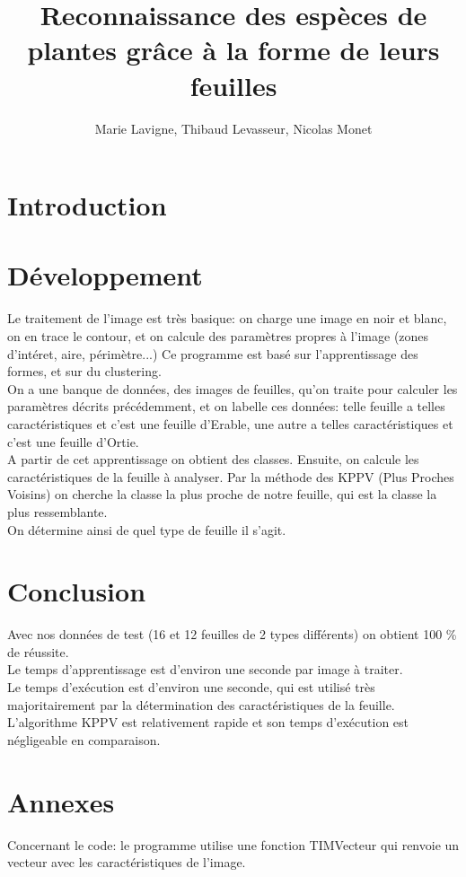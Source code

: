 \documentclass{article}
\title{Reconnaissance des espèces de plantes grâce à la forme de leurs feuilles}
\author{Marie Lavigne, Thibaud Levasseur, Nicolas Monet}
\begin{document}
\maketitle
\newpage
\tableofcontents
\newpage
\section{Introduction}

\newpage
\section{Développement}
Le traitement de l'image est très basique: on charge une image en noir et blanc, on en trace le contour, et on calcule des paramètres propres à l'image (zones d'intéret, aire, périmètre...)
\smallbreak
Ce programme est basé sur l'apprentissage des formes, et sur du clustering. \\
On a une banque de données, des images de feuilles, qu'on traite pour calculer les paramètres décrits précédemment, et on labelle ces données: telle feuille a telles caractéristiques et c'est une feuille d'Erable, une autre a telles caractéristiques et c'est une feuille d'Ortie. \\
A partir de cet apprentissage on obtient des classes.
\smallbreak
Ensuite, on calcule les caractéristiques de la feuille à analyser. Par la méthode des KPPV (Plus Proches Voisins) on cherche la classe la plus proche de notre feuille, qui est la classe la plus ressemblante. \\
On détermine ainsi de quel type de feuille il s'agit.
\newpage
\section{Conclusion}
Avec nos données de test (16 et 12 feuilles de 2 types différents) on obtient 100 \% de réussite.\\
Le temps d'apprentissage est d'environ une seconde par image à traiter. \\
Le temps d'exécution est d'environ une seconde, qui est utilisé très majoritairement par la détermination des caractéristiques de la feuille. L'algorithme KPPV est relativement rapide et son temps d'exécution est négligeable en comparaison.
\newpage
\section{Annexes}
Concernant le code: le programme utilise une fonction TIMVecteur qui renvoie un vecteur avec les caractéristiques de l'image.
\end{document}
